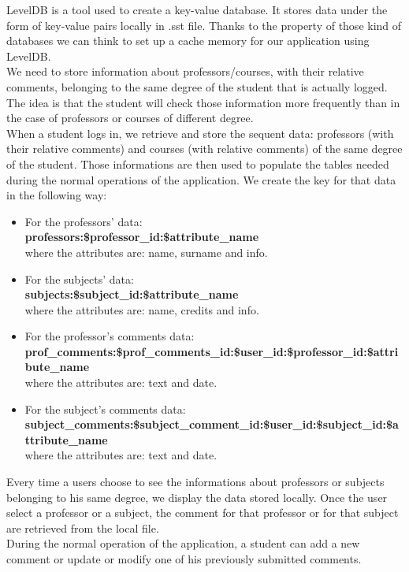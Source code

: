 \documentclass[a4paper, oneside]{article}
\begin{document}
LevelDB is a tool used to create a key-value database. It stores data under the form of key-value pairs locally in .sst file. Thanks to the property of those kind of databases we can think to set up a cache memory for our application using LevelDB.\\
We need to store information about professors/courses, with their relative comments, belonging to the same degree of the student that is actually logged. The idea is that the student will check those information more frequently than in the case of professors or courses of different degree.\\
When a student logs in, we retrieve and store the sequent data: professors (with their relative comments) and courses (with relative comments) of the same degree of the student. Those informations are then used to populate the tables needed during the normal operations of the application. We create the key for that data in the following way:
\begin{itemize}
\item For the professors’ data:\\ \textbf{professors:\$professor\_id:\$attribute\_name}\\ where the attributes are: name, surname and info.
\item For the subjects’ data:\\ \textbf{subjects:\$subject\_id:\$attribute\_name}\\ where the attributes are: name, credits and info.
\item For the professor’s comments data:\\ \textbf{prof\_comments:\$prof\_comments\_id:\$user\_id:\$professor\_id:\$attribute\_name}\\ where the attributes are: text and date.
\item For the subject’s comments data:\\ \textbf{subject\_comments:\$subject\_comment\_id:\$user\_id:\$subject\_id:\$attribute\_name}\\ where the attributes are: text and date.
\end{itemize}
\vspace{2mm}
Every time a users choose to see the informations about professors or subjects belonging to his same degree, we display the data stored locally. Once the user select a professor or a subject, the comment for that professor or for that subject are retrieved from the local file. \\
During the normal operation of the application, a student can add a new comment or update or modify one of his previously submitted comments.\\
\end{document}
